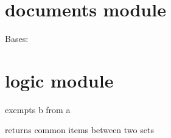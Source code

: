 \documentclass[letterpaper,10pt,english]{sphinxmanual}
\begin{document}
\chapter{documents module}
\label{\detokenize{documents:module-documents}}\label{\detokenize{documents::doc}}\label{\detokenize{documents:documents-module}}

\begin{fulllineitems}
\label{\detokenize{documents:documents.document}}
Bases: 

\begin{fulllineitems}
\label{\detokenize{documents:documents.document.get_content}}
\end{fulllineitems}


\begin{fulllineitems}
\label{\detokenize{documents:documents.document.identifier}}
\end{fulllineitems}


\end{fulllineitems}



\chapter{logic module}
\label{\detokenize{logic:logic-module}}\label{\detokenize{logic:module-logic}}\label{\detokenize{logic::doc}}

\begin{fulllineitems}
\label{\detokenize{logic:logic.exempt}}
exempts b from a

\end{fulllineitems}


\begin{fulllineitems}
\label{\detokenize{logic:logic.intersect}}
returns common items between two sets

\end{fulllineitems}
\end{document}
